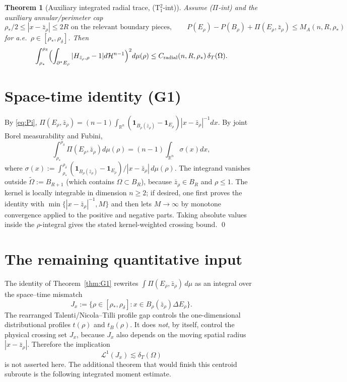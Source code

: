 \documentclass[11pt]{article}
\newtheorem{theorem}{Theorem}[section]
\theoremstyle{definition}
\newcommand{\R}{\mathbb{R}}
\newcommand{\Om}{\Omega}
\newcommand{\rstar}{\rho_{*}}
\newcommand{\zbar}{\bar z_{\rho}}
\newcommand{\PiE}{\Pi(E_{\rho},\zbar)}
\begin{document}
\begin{theorem}[Auxiliary integrated radial trace, (T$_1^2$-int)]\label{thm:T1sq}
Assume \textup{($\Pi$-int)} and the auxiliary annular/perimeter cap
\[
   \rstar/2\le |x-\bar z_\rho|\le 2R \text{ on the relevant boundary pieces},
   \qquad
   P(E_\rho)-P(B_\rho)+\PiE\le M_A(n,R,\rstar)
\]
for a.e.\ $\rho\in[\rstar,\rho_\delta]$. Then
\[
   \int_{\rstar}^{\rho_\delta}\Bigl(\int_{\partial^*E_\rho}|H_{\zbar,\rho}-1|d\mathcal H^{n-1}\Bigr)^2 d\mu(\rho)
   \le C_{\rm radial}(n,R,\rstar)\,\delta_T(\Om).
\]
\end{theorem}

\section{Space-time identity (G1)}\label{sec:G1}

By \eqref{eq:Pi}, $\PiE = (n-1)\int_{\R^n}(\mathbf 1_{B_\rho(\zbar)}-\mathbf 1_{E_\rho})|x-\zbar|^{-1}dx$.
By joint Borel measurability and Fubini,
\begin{equation}\label{eq:fubini}
   \int_{\rstar}^{\rho_\delta}\PiE d\mu(\rho)
   = (n-1)\int_{\R^n}\sigma(x)dx,
\end{equation}
where $\sigma(x):=\int_{\rstar}^{\rho_\delta}(\mathbf 1_{B_\rho(\zbar)}-\mathbf 1_{E_\rho})/|x-\zbar|\,d\mu(\rho)$.
The integrand vanishes outside
$\widetilde\Om:=B_{R+1}$ (which contains $\Om\subset B_R$), because $\zbar\in B_R$ and
$\rho\le1$. The kernel is locally integrable in dimension $n\ge2$; if desired,
one first proves the identity with $\min\{|x-\zbar|^{-1},M\}$ and then lets
$M\to\infty$ by monotone convergence applied to the positive and negative
parts. Taking absolute values inside the $\rho$-integral gives the stated
kernel-weighted crossing bound. \hfill\qed

\section{The remaining quantitative input}\label{sec:G2}

The identity of Theorem~\ref{thm:G1} rewrites
$\int\PiE\,d\mu$ as an integral over the space--time mismatch
\[
   J_x:=\{\rho\in[\rstar,\rho_\delta]:
          x\in B_\rho(\zbar)\Delta E_\rho\}.
\]
The rearranged Talenti/Nicola--Tilli profile gap controls the
one-dimensional distributional profiles \(t(\rho)\) and \(t_B(\rho)\).
It does \emph{not}, by itself, control the physical crossing set
\(J_x\), because \(J_x\) also depends on the moving spatial radius
\(|x-\bar z_\rho|\). Therefore the implication
\[
   \mathcal L^1(J_x)\lesssim\delta_T(\Om)
\]
is not asserted here. The additional theorem that would finish this
centroid subroute is the following integrated moment estimate.
\end{document}
